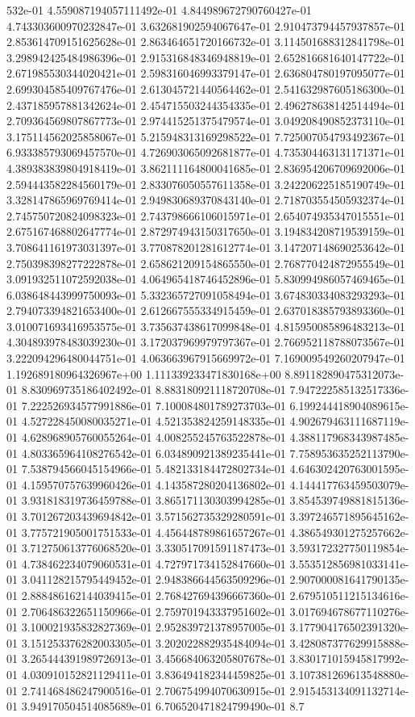 532e-01	4.559087194057111492e-01	4.844989672790760427e-01	4.743303600970232847e-01	3.632681902594067647e-01	2.910473794457937857e-01	2.853614709151625628e-01	2.863464651720166732e-01	3.114501688312841798e-01	3.298942425484986396e-01	2.915316848346948819e-01	2.652816681640147722e-01	2.671985530344020421e-01	2.598316046993379147e-01	2.636804780197095077e-01	2.699304585409767476e-01	2.613045721440564462e-01	2.541632987605186300e-01	2.437185957881342624e-01	2.454715503244354335e-01	2.496278638142514494e-01	2.709364569807867773e-01	2.974415251375479574e-01	3.049208490852373110e-01	3.175114562025858067e-01	5.215948313169298522e-01	7.725007054793492367e-01	6.933385793069457570e-01	4.726903065092681877e-01	4.735304463131171371e-01	4.389383839804918419e-01	3.862111164800041685e-01	2.836954206709692006e-01	2.594443582284560179e-01	2.833076050557611358e-01	3.242206225185190749e-01	3.328147865969769414e-01	2.949830689370843140e-01	2.718703554505932374e-01	2.745750720824098323e-01	2.743798666106015971e-01	2.654074935347015551e-01	2.675167468802647774e-01	2.872974943150317650e-01	3.194834208719539159e-01	3.708641161973031397e-01	3.770878201281612774e-01	3.147207148690253642e-01	2.750398398277222878e-01	2.658621209154865550e-01	2.768770424872955549e-01	3.091932511072592038e-01	4.064965418746452896e-01	5.830994986057469465e-01	6.038648443999750093e-01	5.332365727091058494e-01	3.674830334083293293e-01	2.794073394821653400e-01	2.612667555334915459e-01	2.637018385793893360e-01	3.010071693416953575e-01	3.735637438617099848e-01	4.815950085896483213e-01	4.304893978483039230e-01	3.172037969979797367e-01	2.766952118788073567e-01	3.222094296480044751e-01	4.063663967915669972e-01	7.169009549260207947e-01	1.192689180964326967e+00	1.111339233471830168e+00	8.891182890475312073e-01	8.830969735186402492e-01	8.883180921118720708e-01	7.947222585132517336e-01	7.222526934577991886e-01	7.100084801789273703e-01	6.199244418904089615e-01	4.527228450080035271e-01	4.521353824259148335e-01	4.902679463111687119e-01	4.628968905760055264e-01	4.008255245763522878e-01	4.388117968343987485e-01	4.803365964108276542e-01	6.034890921389235441e-01	7.758953635252113790e-01	7.538794566045154966e-01	5.482133184472802734e-01	4.646302420763001595e-01	4.159570757639960426e-01	4.143587280204136802e-01	4.144417763459503079e-01	3.931818319736459788e-01	3.865171130303994285e-01	3.854539749881815136e-01	3.701267203439694842e-01	3.571562735329280591e-01	3.397246571895645162e-01	3.775721905001751533e-01	4.456448789861657267e-01	4.386549301275257662e-01	3.712750613776068520e-01	3.330517091591187473e-01	3.593172327750119854e-01	4.738462234079060531e-01	4.727971734152847660e-01	3.553512856981033141e-01	3.041128215795449452e-01	2.948386644563509296e-01	2.907000081641790135e-01	2.888486162144039415e-01	2.768427694396667360e-01	2.679510511215134616e-01	2.706486322651150966e-01	2.759701943337951602e-01	3.017694678677110276e-01	3.100021935832827369e-01	2.952839721378957005e-01	3.177904176502391320e-01	3.151253376282003305e-01	3.202022882935484094e-01	3.428087377629915888e-01	3.265444391989726913e-01	3.456684063205807678e-01	3.830171015945817992e-01	4.030910152821129411e-01	3.836494182344459825e-01	3.107381269613548880e-01	2.741468486247900516e-01	2.706754994070630915e-01	2.915453134091132714e-01	3.949170504514085689e-01	6.706520471824799490e-01	8.7
